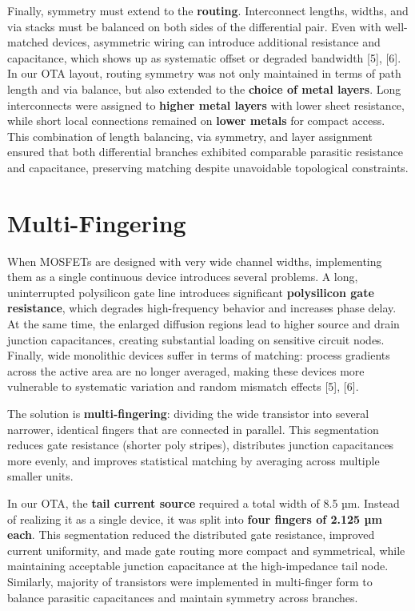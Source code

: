 \documentclass[
  11pt,
  a4paper,
  oneside]{scrbook}
\begin{document}
Finally, symmetry must extend to the \textbf{routing}. Interconnect
lengths, widths, and via stacks must be balanced on both sides of the
differential pair. Even with well-matched devices, asymmetric wiring can
introduce additional resistance and capacitance, which shows up as
systematic offset or degraded bandwidth {[}5{]}, {[}6{]}.\\
In our OTA layout, routing symmetry was not only maintained in terms of
path length and via balance, but also extended to the \textbf{choice of
metal layers}. Long interconnects were assigned to \textbf{higher metal
layers} with lower sheet resistance, while short local connections
remained on \textbf{lower metals} for compact access.\\
This combination of length balancing, via symmetry, and layer assignment
ensured that both differential branches exhibited comparable parasitic
resistance and capacitance, preserving matching despite unavoidable
topological constraints.

\section{Multi-Fingering}\label{multi-fingering}

When MOSFETs are designed with very wide channel widths, implementing
them as a single continuous device introduces several problems. A long,
uninterrupted polysilicon gate line introduces significant
\textbf{polysilicon gate resistance}, which degrades high-frequency
behavior and increases phase delay. At the same time, the enlarged
diffusion regions lead to higher source and drain junction capacitances,
creating substantial loading on sensitive circuit nodes. Finally, wide
monolithic devices suffer in terms of matching: process gradients across
the active area are no longer averaged, making these devices more
vulnerable to systematic variation and random mismatch effects {[}5{]},
{[}6{]}.

The solution is \textbf{multi-fingering}: dividing the wide transistor
into several narrower, identical fingers that are connected in parallel.
This segmentation reduces gate resistance (shorter poly stripes),
distributes junction capacitances more evenly, and improves statistical
matching by averaging across multiple smaller units.

In our OTA, the \textbf{tail current source} required a total width of
8.5 µm. Instead of realizing it as a single device, it was split into
\textbf{four fingers of 2.125 µm each}. This segmentation reduced the
distributed gate resistance, improved current uniformity, and made gate
routing more compact and symmetrical, while maintaining acceptable
junction capacitance at the high-impedance tail node. Similarly,
majority of transistors were implemented in multi-finger form to balance
parasitic capacitances and maintain symmetry across branches.
\end{document}
